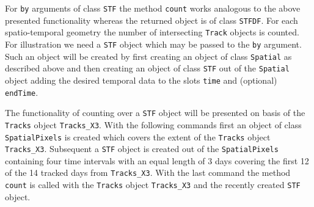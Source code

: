 \documentclass[12pt, oneside, a4paper]{scrbook}
\let\code=\texttt
\begin{document}
For \code{by} arguments of class \code{STF} the method \code{count} works analogous to the above presented functionality whereas the returned object is of class \code{STFDF}. For each spatio-temporal geometry the number of intersecting \code{Track} objects is counted. For illustration we need a \code{STF} object which may be passed to the \code{by} argument. Such an object  will be created by first creating an object of class \code{Spatial} as described above and then creating an object of class \code{STF} out of the \code{Spatial} object adding the desired temporal data to the slots \code{time} and (optional) \code{endTime}.
\par\medskip


% 
% 
% 
% 
% 


The functionality of counting over a \code{STF} object will be presented on basis of the \code{Tracks} object \code{Tracks\_X3}.
With the following commands first an object of class \code{SpatialPixels} is created which covers the extent of the \code{Tracks} object \code{Tracks\_X3}. Subsequent a \code{STF} object is created out of the \code{SpatialPixels} containing four time intervals with an equal length of 3 days covering the first 12 of the 14 tracked days from \code{Tracks\_X3}. With the last command the method \code{count} is called with the \code{Tracks} object \code{Tracks\_X3} and the recently created \code{STF} object.
\end{document}

